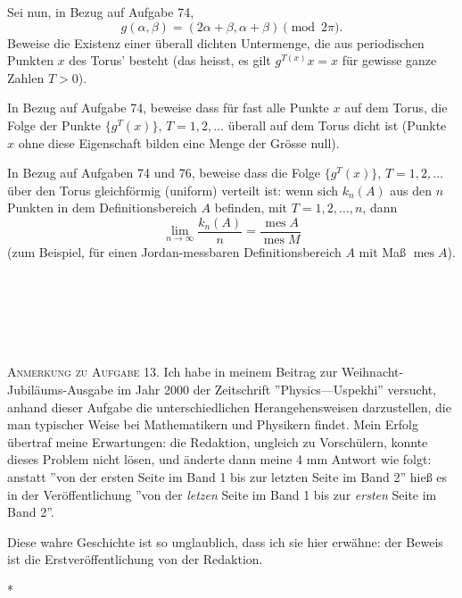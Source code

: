 \documentclass[12pt]{article} %
\begin{document}
\bigskip
{} Sei nun, in Bezug auf Aufgabe 74, 
$$
g(\alpha, \beta)=(2\alpha+\beta,\alpha+\beta) \pmod {2\pi}.
$$ 
Beweise die Existenz einer überall dichten Untermenge, die aus periodischen Punkten $x$ des Torus' besteht (das heisst, es gilt $g^{T (x)} x=x$ für gewisse ganze Zahlen $T>0$).

\bigskip
{} In Bezug auf Aufgabe 74, beweise dass für fast alle Punkte $x$ auf dem Torus, die Folge der Punkte $\{g^T (x)\}$, $T=1, 2, \dots$ überall auf dem Torus dicht ist (Punkte $x$ ohne diese Eigenschaft bilden eine Menge der Grösse null). 

\bigskip
{} In Bezug auf Aufgaben 74 und 76, beweise dass die Folge $\{g^T (x)\}$, $T=1, 2, \dots$ über den Torus gleichförmig (uniform) verteilt ist: wenn sich $k_n(A)$ aus den $n$ Punkten in dem Definitionsbereich $A$ befinden, mit $T=1, 2, \dots,n$, dann
$$
\lim_{n \to \infty} \frac{k_n(A)}{n}=\frac{\operatorname{mes} A}{\operatorname{mes} M}
$$
(zum Beispiel, für einen Jordan-messbaren Definitionsbereich $A$ mit Maß $\operatorname{mes} A$).

\ 

\ 

\ 

\textsc{Anmerkung zu Aufgabe 13.} Ich habe in meinem Beitrag zur Weihnacht-Jubiläums-Ausgabe im Jahr 2000 der Zeitschrift ''Physics—Uspekhi'' versucht, anhand dieser Aufgabe die unterschiedlichen Herangehensweisen darzustellen, die man typischer Weise bei Mathematikern und Physikern findet. Mein Erfolg übertraf meine Erwartungen: die Redaktion, ungleich zu Vorschülern, konnte dieses Problem nicht lösen, und änderte dann meine 4 mm Antwort wie folgt: anstatt ''von der ersten Seite im Band 1 bis zur letzten Seite im Band 2'' hieß es in der Veröffentlichung ''von der {\em letzen\/} Seite im Band 1 bis zur {\em ersten\/} Seite im Band 2''. 

Diese wahre Geschichte ist so unglaublich, dass ich sie hier erwähne: der Beweis ist die Erstveröffentlichung von der Redaktion. 
\ 

\vspace{0pt plus 12pt}
\centerline{*\quad *\quad*}
\vspace{.4\baselineskip}

\

\ 

\ 

{\em
{}
}
\end{document}
